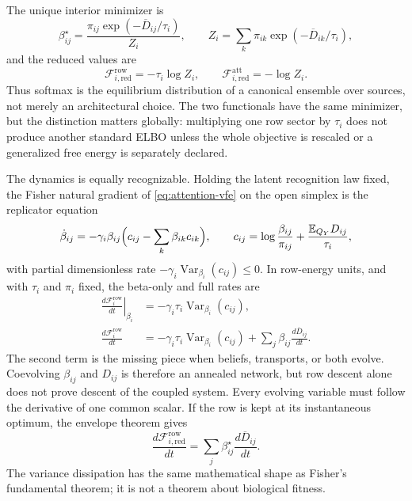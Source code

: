 \documentclass[11pt,letterpaper]{article}
\newcommand{\Ex}{\mathbb E}
\begin{document}
The unique interior minimizer is
\begin{equation}
  \beta_{ij}^{\star}
  =\frac{\pi_{ij}\exp(-\overline D_{ij}/\tau_i)}{Z_i},
  \qquad
  Z_i=\sum_k\pi_{ik}\exp(-\overline D_{ik}/\tau_i),
  \label{eq:attention-row-optimum}
\end{equation}
and the reduced values are
\begin{equation}
  \mathcal F_{i,\mathrm{red}}^{\mathrm{row}}=-\tau_i\log Z_i,
  \qquad
  \mathcal F_{i,\mathrm{red}}^{\mathrm{att}}=-\log Z_i.
  \label{eq:attention-row-reduced}
\end{equation}
Thus softmax is the equilibrium distribution of a canonical ensemble over sources, not merely an architectural choice. The two functionals have the same minimizer, but the distinction matters globally: multiplying one row sector by \(\tau_i\) does not produce another standard ELBO unless the whole objective is rescaled or a generalized free energy is separately declared.

The dynamics is equally recognizable. Holding the latent recognition law fixed, the Fisher natural gradient of \eqref{eq:attention-vfe} on the open simplex is the replicator equation
\begin{equation}
  \dot\beta_{ij}=-\gamma_i\beta_{ij}\Bigl(c_{ij}-\sum_k\beta_{ik}c_{ik}\Bigr),
  \qquad
  c_{ij}=\log\frac{\beta_{ij}}{\pi_{ij}}+\frac{\Ex_{Q_Y}D_{ij}}{\tau_i},
  \label{eq:replicator}
\end{equation}
with partial dimensionless rate \(-\gamma_i\operatorname{Var}_{\beta_i}(c_{ij})\leq0\). In row-energy units, and with \(\tau_i\) and \(\pi_i\) fixed, the beta-only and full rates are
\begin{align}
  \left.\frac{d\mathcal F_i^{\mathrm{row}}}{dt}\right|_{\beta_i}
  &=-\gamma_i\tau_i\operatorname{Var}_{\beta_i}(c_{ij}),
  \nonumber\\
  \frac{d\mathcal F_i^{\mathrm{row}}}{dt}
  &=-\gamma_i\tau_i\operatorname{Var}_{\beta_i}(c_{ij})
  +\sum_j\beta_{ij}\frac{d\overline D_{ij}}{dt}.
  \label{eq:attention-row-total-rate}
\end{align}
The second term is the missing piece when beliefs, transports, or both evolve. Coevolving \(\beta_{ij}\) and \(D_{ij}\) is therefore an annealed network, but row descent alone does not prove descent of the coupled system. Every evolving variable must follow the derivative of one common scalar. If the row is kept at its instantaneous optimum, the envelope theorem gives
\begin{equation}
  \frac{d\mathcal F_{i,\mathrm{red}}^{\mathrm{row}}}{dt}
  =\sum_j\beta_{ij}^{\star}\frac{d\overline D_{ij}}{dt}.
  \label{eq:attention-row-envelope}
\end{equation}
The variance dissipation has the same mathematical shape as Fisher's fundamental theorem; it is not a theorem about biological fitness.
\end{document}
